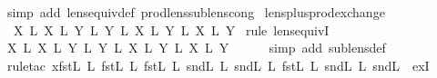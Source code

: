 \begin{isabellebody}
\ {\isacharparenleft}simp\ add{\isacharcolon}\ lens{\isacharunderscore}equiv{\isacharunderscore}def\ prod{\isacharunderscore}lens{\isacharunderscore}sublens{\isacharunderscore}cong{\isacharparenright}%
\endisatagproof
{\isafoldproof}%
%
\isadelimproof
\isanewline
%
\endisadelimproof
\isanewline
{}\isamarkupfalse%
\ lens{\isacharunderscore}plus{\isacharunderscore}prod{\isacharunderscore}exchange{\isacharcolon}\isanewline
\ \ {\isachardoublequoteopen}{\isacharparenleft}X\ {\isacharplus}\isactrlsub L\ X\ {\isasymtimes}\isactrlsub L\ {\isacharparenleft}Y\ {\isacharplus}\isactrlsub L\ Y\ {\isasymapprox}\isactrlsub L\ {\isacharparenleft}X\ {\isasymtimes}\isactrlsub L\ Y\ {\isacharplus}\isactrlsub L\ {\isacharparenleft}X\ {\isasymtimes}\isactrlsub L\ Y\isanewline
%
\isadelimproof
%
\endisadelimproof
%
\isatagproof
{}\isamarkupfalse%
\ {\isacharparenleft}rule\ lens{\isacharunderscore}equivI{\isacharparenright}\isanewline
\ \ \isamarkupfalse%
\ {\isachardoublequoteopen}{\isacharparenleft}X\ {\isacharplus}\isactrlsub L\ X\ {\isasymtimes}\isactrlsub L\ {\isacharparenleft}Y\ {\isacharplus}\isactrlsub L\ Y\ {\isasymsubseteq}\isactrlsub L\ {\isacharparenleft}X\ {\isasymtimes}\isactrlsub L\ Y\ {\isacharplus}\isactrlsub L\ {\isacharparenleft}X\ {\isasymtimes}\isactrlsub L\ Y\isanewline
\ \ \ \ \isamarkupfalse%
\ {\isacharparenleft}simp\ add{\isacharcolon}\ sublens{\isacharunderscore}def{\isacharparenright}\isanewline
\ \ \ \ \isamarkupfalse%
\ {\isacharparenleft}rule{\isacharunderscore}tac\ x{\isacharequal}{\isachardoublequoteopen}{\isacharparenleft}{\isacharparenleft}fst\isactrlsub L\ {\isacharsemicolon}\isactrlsub L\ fst\isactrlsub L{\isacharparenright}\ {\isacharplus}\isactrlsub L\ {\isacharparenleft}fst\isactrlsub L\ {\isacharsemicolon}\isactrlsub L\ snd\isactrlsub L{\isacharparenright}{\isacharparenright}\ {\isacharplus}\isactrlsub L\ {\isacharparenleft}{\isacharparenleft}snd\isactrlsub L\ {\isacharsemicolon}\isactrlsub L\ fst\isactrlsub L{\isacharparenright}\ {\isacharplus}\isactrlsub L\ {\isacharparenleft}snd\isactrlsub L\ {\isacharsemicolon}\isactrlsub L\ snd\isactrlsub L{\isacharparenright}{\isacharparenright}{\isachardoublequoteclose}\ \ exI{\isacharparenright}\isanewline

\end{isabellebody}

